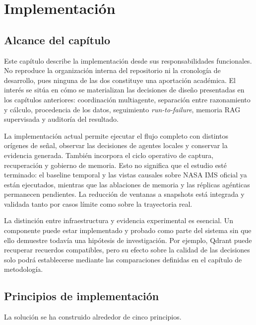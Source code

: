 \chapter{Implementación}\label{chap:implementacion}

\section{Alcance del capítulo}

Este capítulo describe la implementación desde sus responsabilidades funcionales.
No reproduce la organización interna del repositorio ni la cronología de
desarrollo, pues ninguna de las dos constituye una aportación académica. El
interés se sitúa en cómo se materializan las decisiones de diseño presentadas
en los capítulos anteriores: coordinación multiagente, separación entre
razonamiento y cálculo, procedencia de los datos, seguimiento
\textit{run-to-failure}, memoria RAG supervisada y auditoría del resultado.

La implementación actual permite ejecutar el flujo completo con distintos
orígenes de señal, observar las decisiones de agentes locales y conservar la
evidencia generada. También incorpora el ciclo operativo de captura,
recuperación y gobierno de memoria. Esto no significa que el estudio esté
terminado: el baseline temporal y las vistas causales sobre NASA IMS oficial ya
están ejecutados, mientras que las ablaciones de memoria y las réplicas
agénticas permanecen pendientes. La reducción de ventanas a snapshots está
integrada y validada tanto por casos límite como sobre la trayectoria real.

La distinción entre infraestructura y evidencia experimental es esencial. Un
componente puede estar implementado y probado como parte del
sistema sin que ello demuestre todavía una hipótesis de investigación. Por
ejemplo, Qdrant puede recuperar recuerdos compatibles, pero su efecto sobre la
calidad de las decisiones solo podrá establecerse mediante las comparaciones
definidas en el capítulo de metodología.

\section{Principios de implementación}

La solución se ha construido alrededor de cinco principios.

